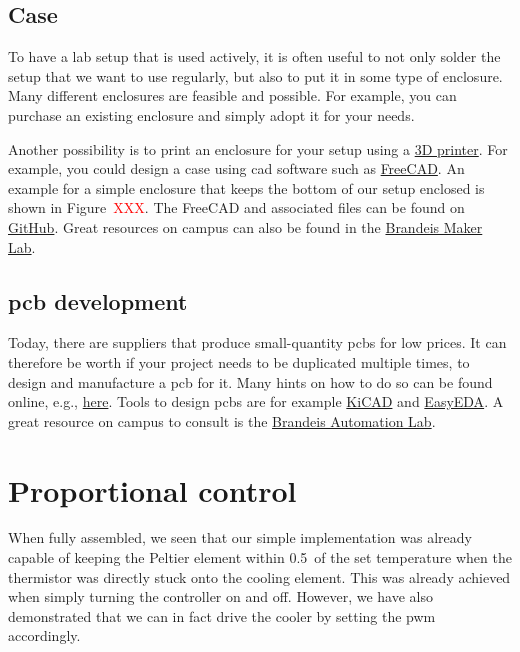 \subsection{Case}

To have a lab setup that is used actively, it is often useful to not only solder the setup that we want to use regularly, but also to put it in some type of enclosure. Many different enclosures are feasible and possible. For example, you can purchase an existing enclosure and simply adopt it for your needs. 

Another possibility is to print an enclosure for your setup using a \href{https://en.wikipedia.org/wiki/3D_printing}{3D printer}. For example, you could design a case using \ac{cad} software such as \href{https://www.freecad.org/}{FreeCAD}. An example for a simple enclosure that keeps the bottom of our setup enclosed is shown in Figure~\textcolor{red}{XXX}. The FreeCAD and associated files can be found on \href{https://github.com/galactic-forensics/workshop_arduino_electronics/tree/main/3d_files}{GitHub}. Great resources on campus can also be found in the \href{https://www.brandeis.edu/library/research-technology-innovation/makerlab.html}{Brandeis Maker Lab}.


\subsection{\Ac{pcb} development}

Today, there are suppliers that produce small-quantity \acp{pcb} for low prices. It can therefore be worth if your project needs to be duplicated multiple times, to design and manufacture a \ac{pcb} for it. Many hints on how to do so can be found online, e.g., \href{https://maker.pro/arduino/projects/7-tips-for-beginners-about-how-to-design-a-pcb-1}{here}. Tools to design \acp{pcb} are for example \href{https://www.kicad.org/}{KiCAD} and \href{https://easyeda.com/}{EasyEDA}. A great resource on campus to consult is the \href{https://www.brandeis.edu/library/research-technology-innovation/automation.html}{Brandeis Automation Lab}.


\section{Proportional control}

When fully assembled, we seen that our simple implementation was already capable of keeping the Peltier element within 0.5\celsius\ of the set temperature when the thermistor was directly stuck onto the cooling element. This was already achieved when simply turning the controller on and off. However, we have also demonstrated that we can in fact drive the cooler by setting the \ac{pwm} accordingly.

